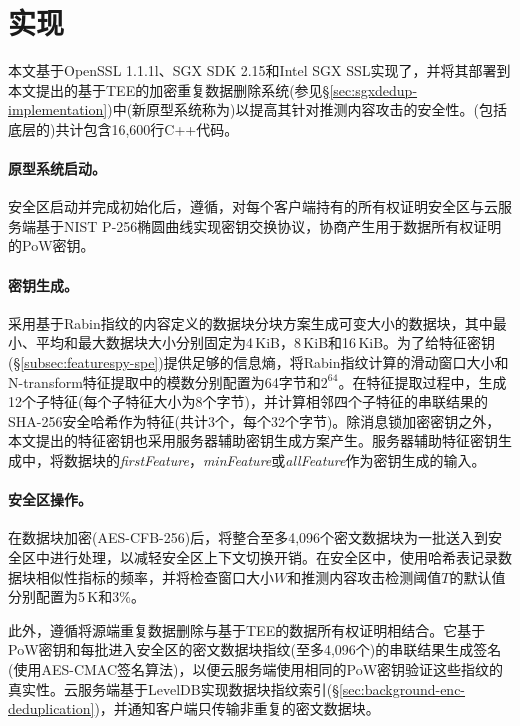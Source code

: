 \section{\prototype 实现}
\label{sec:featurespy-implementation}
本文基于OpenSSL 1.1.1l、SGX SDK 2.15和Intel SGX SSL实现了\sysnameF，并将其部署到本文提出的基于TEE的加密重复数据删除系统\sysnameS (参见\S\ref{sec:sgxdedup-implementation})中(新原型系统称为\prototype)以提高其针对推测内容攻击的安全性。\prototype(包括底层的\sysnameS )共计包含16,600行C++代码。

\paragraph*{原型系统启动。}
安全区启动并完成初始化后，\prototype 遵循\sysnameS，对每个客户端持有的所有权证明安全区与云服务端基于NIST P-256椭圆曲线实现密钥交换协议，协商产生用于数据所有权证明的PoW密钥。

\paragraph*{密钥生成。}
\prototype 采用基于Rabin指纹的内容定义的数据块分块方案生成可变大小的数据块，其中最小、平均和最大数据块大小分别固定为4\,KiB，8\,KiB和16\,KiB。为了给特征密钥(\S\ref{subsec:featurespy-spe})提供足够的信息熵，将Rabin指纹计算的滑动窗口大小和N-transform特征提取中的模数分别配置为64字节和$2^{64}$。在特征提取过程中，生成12个子特征(每个子特征大小为8个字节)，并计算相邻四个子特征的串联结果的SHA-256安全哈希作为特征(共计3个，每个32个字节)。除消息锁加密密钥之外，本文提出的特征密钥也采用服务器辅助密钥生成方案产生。服务器辅助特征密钥生成中，将数据块的\textit{firstFeature}，\textit{minFeature}或\textit{allFeature}作为密钥生成的输入。

\paragraph*{安全区操作。}
在数据块加密(AES-CFB-256)后，\prototype 将整合至多4,096个密文数据块为一批送入到安全区中进行处理，以减轻安全区上下文切换开销。在安全区中，\prototype 使用哈希表记录数据块相似性指标的频率，并将检查窗口大小$W$和推测内容攻击检测阈值$T$的默认值分别配置为5\,K和3\%。

此外，\prototype 遵循\sysnameS 将源端重复数据删除与基于TEE的数据所有权证明相结合。它基于PoW密钥和每批进入安全区的密文数据块指纹(至多4,096个)的串联结果生成签名(使用AES-CMAC签名算法)，以便云服务端使用相同的PoW密钥验证这些指纹的真实性。云服务端基于LevelDB实现数据块指纹索引(\S\ref{sec:background-enc-deduplication})，并通知客户端只传输非重复的密文数据块。

